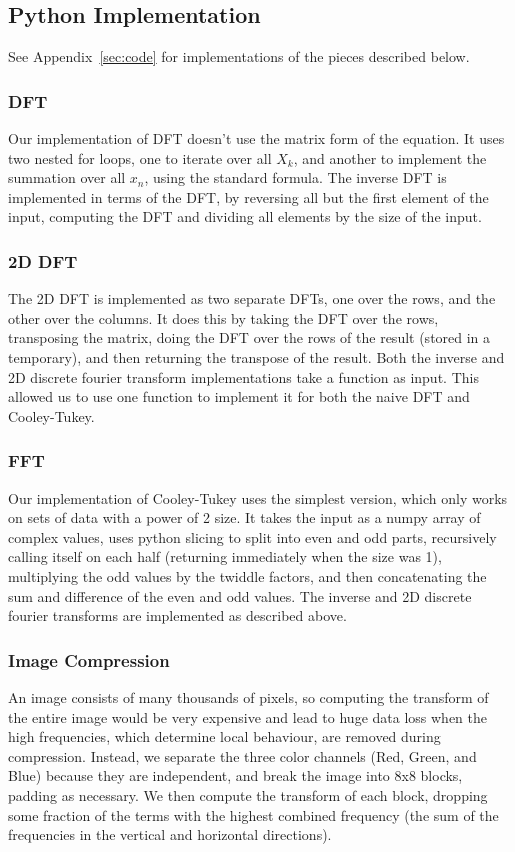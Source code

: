 \subsection{Python Implementation}
	See Appendix~\ref{sec:code} for implementations of the pieces described below.
	\subsubsection{DFT}
		Our implementation of DFT doesn't use the matrix form of the equation. It uses two nested for loops, one to iterate over all $X_k$, and another to implement the summation over all $x_n$, using the standard formula. The inverse DFT is implemented in terms of the DFT, by reversing all but the first element of the input, computing the DFT and dividing all elements by the size of the input.
	\subsubsection{2D DFT}
		The 2D DFT is implemented as two separate DFTs, one over the rows, and the other over the columns. It does this by taking the DFT over the rows, transposing the matrix, doing the DFT over the rows of the result (stored in a temporary), and then returning the transpose of the result. Both the inverse and 2D discrete fourier transform implementations take a function as input. This allowed us to use one function to implement it for both the naive DFT and Cooley-Tukey.
	\subsubsection{FFT}
		Our implementation of Cooley-Tukey uses the simplest version, which only works on sets of data with a power of 2 size. It takes the input as a numpy array of complex values, uses python slicing to split into even and odd parts, recursively calling itself on each half (returning immediately when the size was 1), multiplying the odd values by the twiddle factors, and then concatenating the sum and difference of the even and odd values. The inverse and 2D discrete fourier transforms are implemented as described above.
	\subsubsection{Image Compression}
		An image consists of many thousands of pixels, so computing the transform of the entire image would be very expensive and lead to huge data loss when the high frequencies, which determine local behaviour, are removed during compression. Instead, we separate the three color channels (Red, Green, and Blue) because they are independent, and break the image into 8x8 blocks, padding as necessary. We then compute the transform of each block, dropping some fraction of the terms with the highest combined frequency (the sum of the frequencies in the vertical and horizontal directions).

